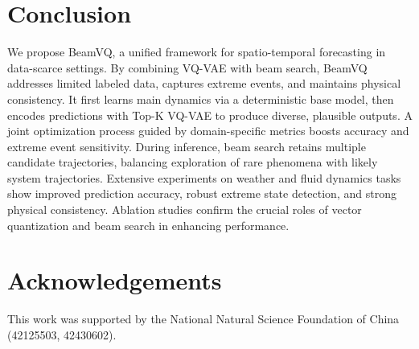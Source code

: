 \section{Conclusion}
We propose BeamVQ, a unified framework for spatio-temporal forecasting in data-scarce settings. By combining VQ-VAE with beam search, BeamVQ addresses limited labeled data, captures extreme events, and maintains physical consistency. It first learns main dynamics via a deterministic base model, then encodes predictions with Top-K VQ-VAE to produce diverse, plausible outputs. A joint optimization process guided by domain-specific metrics boosts accuracy and extreme event sensitivity. During inference, beam search retains multiple candidate trajectories, balancing exploration of rare phenomena with likely system trajectories. Extensive experiments on weather and fluid dynamics tasks show improved prediction accuracy, robust extreme state detection, and strong physical consistency. Ablation studies confirm the crucial roles of vector quantization and beam search in enhancing performance.
\section*{Acknowledgements}
This work was supported by the National Natural Science Foundation of China (42125503, 42430602).
